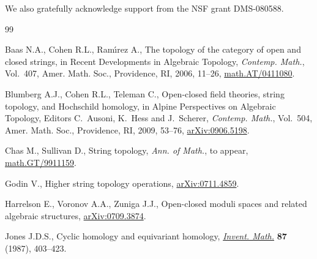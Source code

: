\documentclass[pdftex]{sigma}
\begin{document}
We also gratefully acknowledge support from the NSF grant DMS-080588.


\begin{thebibliography}{99}

\footnotesize\itemsep=0pt

Baas N.A., Cohen  R.L., Ram\'{\i}rez A.,
The topology of the category of open and closed strings,
in Recent Developments in Algebraic Topology,
{\it Contemp. Math.}, Vol.~407, Amer. Math. Soc., Providence, RI, 2006,  11--26,
\href{http://arxiv.org/abs/math.AT/0411080}{math.AT/0411080}.

Blumberg A.J., Cohen R.L., Teleman C.,
Open-closed f\/ield theories, string topology, and Hochschild homo\-lo\-gy,
in Alpine Perspectives on Algebraic Topology, Editors C.~Ausoni, K.~Hess and J.~Scherer,
{\it Contemp. Math.}, Vol.~504, Amer. Math. Soc., Providence, RI, 2009, 53--76,
\href{http://arxiv.org/abs/0906.5198}{arXiv:0906.5198}.


 Chas M., Sullivan D.,
String topology,
{\it Ann. of Math.}, to appear,
\href{http://arxiv.org/abs/math.GT/9911159}{math.GT/9911159}.

Godin V.,
Higher string topology operations,
\href{http://arxiv.org/abs/0711.4859}{arXiv:0711.4859}.

Harrelson E., Voronov A.A., Zuniga J.J.,
Open-closed moduli spaces and related algebraic structures,
\href{http://arxiv.org/abs/0709.3874}{arXiv:0709.3874}.

Jones J.D.S.,
Cyclic homology and equivariant homology,
\href{http://dx.doi.org/10.1007/BF01389424}{{\it Invent. Math.}} {\bf 87} (1987), 403--423.





\end{thebibliography}
\end{document}
